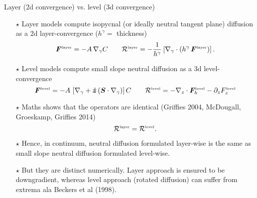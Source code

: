 \documentclass{beamer}
\begin{document}
\begin{frame}{Layer (2d convergence) vs. level (3d convergence)}

\begin{itemize}

\item[$\star$] Layer models compute isopycnal (or ideally neutral tangent plane) diffusion as a 2d layer-convergence 
($h^{\gamma} = $ thickness)
\begin{equation}
     {\bm F}^{\mbox{\tiny layer}}= - A \, \nabla_{\gamma} C
     \qquad 
      {\cal R}^{\mbox{\tiny layer}} = 
     -\frac{1}{h^{\gamma} }  
     \left[ \nabla_{\gamma} \cdot (h^{\gamma} \,
     {\bm F}^{\mbox{\tiny layer}} ) \right].
\end{equation}

\item[$\star$] Level models compute small slope neutral diffusion as a 3d level-convergence
\begin{equation}
   {\bm F}^{\mbox{\tiny level}} 
  =  -A \, \left[ \nabla_{\gamma}  + \hat{\bm z} \, ({\bm S} \cdot \nabla_{\gamma} ) \right] C  
   \qquad 
   {\cal R}^{\mbox{\tiny level}} 
    = -\nabla_{z} \cdot {\bm F}_{h}^{\mbox{\tiny level}}   
    - \partial_{z} F_{z}^{\mbox{\tiny level}}
\end{equation}

\item[$\star$] Maths shows that the operators are identical
(Griffies 2004, McDougall, Groeskamp, Griffies 2014) 
\begin{equation}
 {\cal R}^{\mbox{\tiny layer}}  = {\cal R}^{\mbox{\tiny level}}.
\end{equation}

\item[$\star$] Hence, in continuum, neutral diffusion formulated layer-wise is the same as small slope neutral diffusion formulated level-wise. 

\item[$\star$] But they are distinct numerically. Layer approach is ensured to be downgradient, whereas level approach (rotated diffusion) can suffer from extrema ala Beckers et al (1998). 


\end{itemize}

\end{frame}
\end{document}
